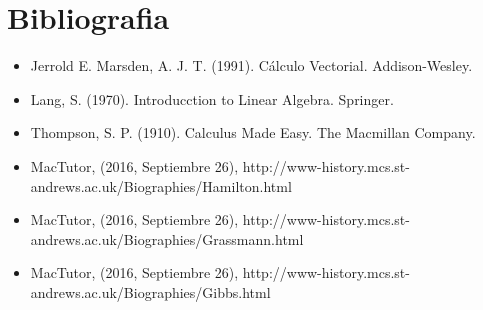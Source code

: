
\section{Bibliografia}
\begin{itemize}
\item Jerrold E. Marsden, A. J. T. (1991). Cálculo Vectorial. Addison-Wesley. 

\item Lang, S. (1970). Introducction to Linear Algebra. Springer. 

\item Thompson, S. P. (1910). Calculus Made Easy. The Macmillan Company. 

\item MacTutor, (2016, Septiembre 26), http://www-history.mcs.st-andrews.ac.uk/Biographies/Hamilton.html
\item MacTutor, (2016, Septiembre 26), http://www-history.mcs.st-andrews.ac.uk/Biographies/Grassmann.html
\item MacTutor, (2016, Septiembre 26), http://www-history.mcs.st-andrews.ac.uk/Biographies/Gibbs.html
\end{itemize}
